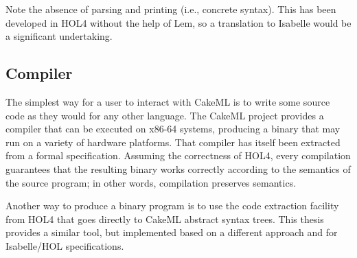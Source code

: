 \noindent
Note the absence of parsing and printing (i.e., concrete syntax).
This has been developed in HOL4 without the help of Lem, so a translation to Isabelle would be a significant undertaking.

\subsection{Compiler}

The simplest way for a user to interact with CakeML is to write some source code as they would for any other language.
The CakeML project provides a compiler that can be executed on x86-64 systems, producing a binary that may run on a variety of hardware platforms.
That compiler has itself been extracted from a formal specification.
Assuming the correctness of HOL4, every compilation guarantees that the resulting binary works correctly according to the semantics of the source program; in other words, compilation preserves semantics.

Another way to produce a binary program is to use the code extraction facility from HOL4 that goes directly to CakeML abstract syntax trees.
This thesis provides a similar tool, but implemented based on a different approach and for Isabelle/HOL specifications.